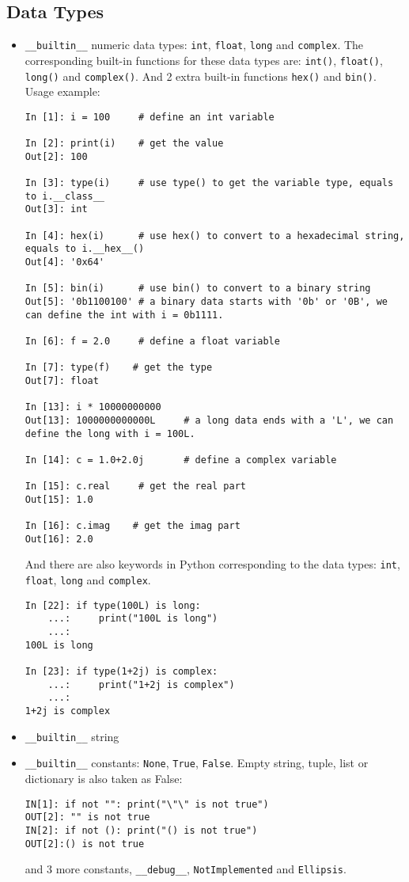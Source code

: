 \documentclass{article}
\begin{document}
\subsection{Data Types}
\begin{itemize}
\item
\verb/__builtin__/ numeric data types: \verb/int/, \verb/float/, \verb/long/ and \verb/complex/.
The corresponding built-in functions for these data types are:
\verb/int()/, \verb/float()/, \verb/long()/ and
\verb/complex()/.  And 2 extra built-in functions \verb/hex()/ and \verb/bin()/.
Usage example:

\begin{lstlisting}
In [1]: i = 100     # define an int variable

In [2]: print(i)    # get the value
Out[2]: 100

In [3]: type(i)     # use type() to get the variable type, equals to i.__class__
Out[3]: int

In [4]: hex(i)      # use hex() to convert to a hexadecimal string, equals to i.__hex__()
Out[4]: '0x64'

In [5]: bin(i)      # use bin() to convert to a binary string
Out[5]: '0b1100100' # a binary data starts with '0b' or '0B', we can define the int with i = 0b1111.

In [6]: f = 2.0     # define a float variable

In [7]: type(f)    # get the type
Out[7]: float

In [13]: i * 10000000000    
Out[13]: 1000000000000L     # a long data ends with a 'L', we can define the long with i = 100L.

In [14]: c = 1.0+2.0j       # define a complex variable

In [15]: c.real     # get the real part
Out[15]: 1.0

In [16]: c.imag    # get the imag part
Out[16]: 2.0
\end{lstlisting}

And there are also keywords in Python corresponding to the data types:
\verb/int/, \verb/float/, \verb/long/ and \verb/complex/.

\begin{lstlisting}
In [22]: if type(100L) is long:
    ...:     print("100L is long")
    ...: 
100L is long

In [23]: if type(1+2j) is complex:
    ...:     print("1+2j is complex")
    ...: 
1+2j is complex
\end{lstlisting}

\item
 \verb/__builtin__/ string

\item
\verb/__builtin__/ constants: \verb/None/, \verb/True/, \verb/False/. Empty string, tuple, list
or dictionary is also taken as False:

\begin{lstlisting}
IN[1]: if not "": print("\"\" is not true")
OUT[2]: "" is not true 
IN[2]: if not (): print("() is not true")
OUT[2]:() is not true
\end{lstlisting}

and 3 more constants, \verb/__debug__/, \verb/NotImplemented/ and \verb/Ellipsis/.
\end{itemize}
\end{document}
